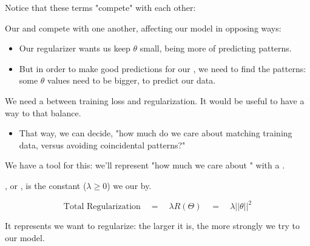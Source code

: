         Notice that these terms "compete" with each other:\\

        \begin{concept}
            Our  and  compete with one another, affecting our model in opposing ways:

            \begin{itemize}
                \item Our regularizer wants us keep $\theta$ small, being more  of predicting patterns.

                \item But in order to make good predictions for our , we need to find the  patterns: some $\theta$ values need to be bigger, to predict our data.
            \end{itemize}
        \end{concept}



        We need a  between training loss and regularization. It would be useful to have a way to  that balance.

        \begin{itemize}
            \item That way, we can decide, "how much do we care about matching training data, versus avoiding coincidental patterns?"
        \end{itemize}

        We have a tool for this: we'll represent "how much we care about " with a  \red{$\lambda$}.\\

        \begin{definition}
            , or \vocab{$\lambda$}, is the constant ($\lambda \geq 0$) we  our  by.

            \begin{equation*}
                \text{Total Regularization} \quad=\quad  \lambda R(\Theta) 
                \quad = \quad \lambda ||\theta||^2
            \end{equation*}
            
            It represents  we want to regularize: the larger it is, the more strongly we try to  our model.

        \end{definition}


